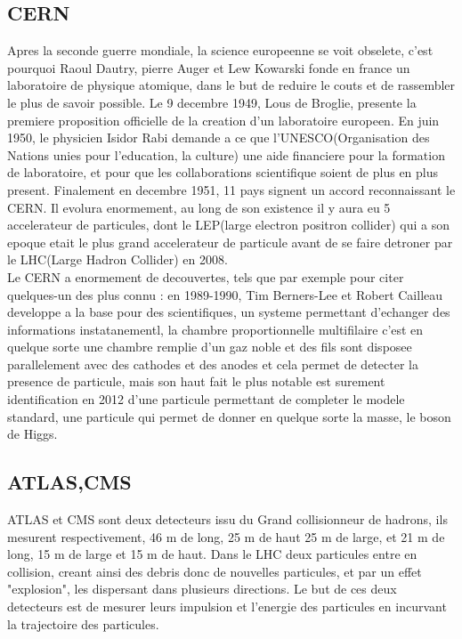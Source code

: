 \documentclass[a4paper,12pt,oneside,openright]{book} %
\begin{document}
        \subsection{CERN}
            Apres la seconde guerre mondiale, la science europeenne se voit obselete, c'est pourquoi Raoul Dautry, pierre Auger et Lew Kowarski fonde en france un laboratoire de physique atomique, dans le but de reduire le couts et de rassembler le plus de savoir possible. Le 9 decembre 1949, Lous de Broglie, presente la premiere proposition officielle de la creation d'un laboratoire europeen. En  juin 1950, le physicien Isidor  Rabi demande a  ce que l'UNESCO(Organisation des Nations unies pour l'education, la culture) une aide financiere pour la formation de laboratoire, et pour que les collaborations scientifique soient de plus en plus present. Finalement en decembre 1951, 11 pays signent un accord reconnaissant le CERN. Il evolura enormement, au long de son existence il y aura eu 5 accelerateur de particules, dont le LEP(large electron positron collider) qui a son epoque etait le plus grand accelerateur de particule avant de se faire detroner par le LHC(Large Hadron Collider) en 2008.\\
            Le CERN a enormement de decouvertes, tels que par exemple pour citer quelques-un des plus connu : en 1989-1990, Tim Berners-Lee et Robert Cailleau developpe a la base pour des scientifiques, un systeme permettant d'echanger des informations instatanementl, la chambre proportionnelle multifilaire c'est en quelque sorte une chambre remplie d'un gaz noble et des fils sont disposee parallelement avec des cathodes et des anodes et cela permet de detecter la presence de particule, mais son haut fait le plus notable est surement identification en 2012 d'une particule permettant de completer le modele standard, une particule qui permet de donner en quelque sorte la masse, le boson de Higgs.
            
            
            
        \subsection{ATLAS,CMS}
        ATLAS et CMS sont deux detecteurs issu du Grand collisionneur de hadrons, ils mesurent respectivement, 46 m de long, 25 m de haut 25 m de large, et 21 m de long, 15 m de large et 15 m de haut. Dans le LHC deux particules entre en collision, creant ainsi des debris donc de nouvelles particules, et par un effet "explosion", les dispersant dans plusieurs directions. Le but de ces deux detecteurs est de mesurer leurs impulsion et l'energie des particules en incurvant la trajectoire des particules.\\
        
\end{document}
